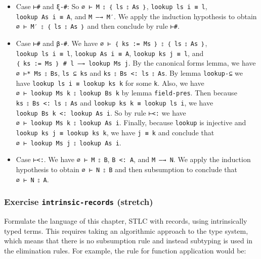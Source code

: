 \begin{itemize}
\item
  Case \texttt{⊢\#} and \texttt{ξ-\#}: So
  \texttt{∅\ ⊢\ M\ ⦂\ ｛\ ls\ ⦂\ As\ ｝}, \texttt{lookup\ ls\ i\ ≡\ l},
  \texttt{lookup\ As\ i\ ≡\ A}, and \texttt{M\ —→\ M′}. We apply the
  induction hypothesis to obtain \texttt{∅\ ⊢\ M′\ ⦂\ ｛\ ls\ ⦂\ As\ ｝}
  and then conclude by rule \texttt{⊢\#}.
\item
  Case \texttt{⊢\#} and \texttt{β-\#}. We have
  \texttt{∅\ ⊢\ ｛\ ks\ :=\ Ms\ ｝\ ⦂\ ｛\ ls\ ⦂\ As\ ｝},
  \texttt{lookup\ ls\ i\ ≡\ l}, \texttt{lookup\ As\ i\ ≡\ A},
  \texttt{lookup\ ks\ j\ ≡\ l}, and
  \texttt{｛\ ks\ :=\ Ms\ ｝\ \#\ l\ —→\ lookup\ Ms\ j}. By the
  canonical forms lemma, we have \texttt{∅\ ⊢*\ Ms\ ⦂\ Bs},
  \texttt{ls\ ⊆\ ks} and \texttt{ks\ ⦂\ Bs\ \textless{}:\ ls\ ⦂\ As}. By
  lemma \texttt{lookup-⊆} we have
  \texttt{lookup\ ls\ i\ ≡\ lookup\ ks\ k} for some \texttt{k}. Also, we
  have \texttt{∅\ ⊢\ lookup\ Ms\ k\ ⦂\ lookup\ Bs\ k} by lemma
  \texttt{field-pres}. Then because
  \texttt{ks\ ⦂\ Bs\ \textless{}:\ ls\ ⦂\ As} and
  \texttt{lookup\ ks\ k\ ≡\ lookup\ ls\ i}, we have
  \texttt{lookup\ Bs\ k\ \textless{}:\ lookup\ As\ i}. So by rule
  \texttt{⊢\textless{}:} we have
  \texttt{∅\ ⊢\ lookup\ Ms\ k\ ⦂\ lookup\ As\ i}. Finally, because
  \texttt{lookup} is injective and
  \texttt{lookup\ ks\ j\ ≡\ lookup\ ks\ k}, we have \texttt{j\ ≡\ k} and
  conclude that \texttt{∅\ ⊢\ lookup\ Ms\ j\ ⦂\ lookup\ As\ i}.
\item
  Case \texttt{⊢\textless{}:}. We have \texttt{∅\ ⊢\ M\ ⦂\ B},
  \texttt{B\ \textless{}:\ A}, and \texttt{M\ —→\ N}. We apply the
  induction hypothesis to obtain \texttt{∅\ ⊢\ N\ ⦂\ B} and then
  subsumption to conclude that \texttt{∅\ ⊢\ N\ ⦂\ A}.
\end{itemize}

\hypertarget{exercise-intrinsic-records-stretch}{%
\subsubsection{\texorpdfstring{Exercise \texttt{intrinsic-records}
(stretch)}{Exercise intrinsic-records (stretch)}}\label{exercise-intrinsic-records-stretch}}

Formulate the language of this chapter, STLC with records, using
intrinsically typed terms. This requires taking an algorithmic approach
to the type system, which means that there is no subsumption rule and
instead subtyping is used in the elimination rules. For example, the
rule for function application would be:

